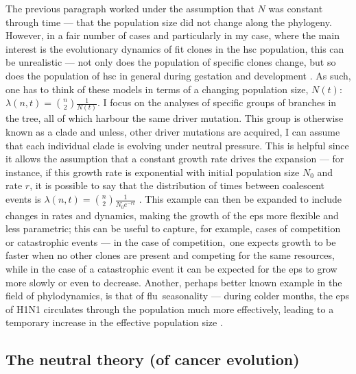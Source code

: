 The previous paragraph worked under the assumption that $N$ was constant through time --- that the population size did not change along the phylogeny. However, in a fair number of cases and particularly in my case, where the main interest is the evolutionary dynamics of fit clones in the \ac{hsc} population, this can be unrealistic --- not only does the population of specific clones change, but so does the population of \ac{hsc} in general during gestation and development \cite{Lee-Six2018-lp}. As such, one has to think of these models in terms of a changing population size, $N(t)$: $\lambda(n,t) = \binom{n}{2}\frac{1}{N(t)}$. I focus on the analyses of specific groups of branches in the tree, all of which harbour the same driver mutation. This group is otherwise known as a clade and unless, other driver mutations are acquired, I can assume that each individual clade is evolving under neutral pressure. This is helpful since it allows the assumption that a constant growth rate drives the expansion --- for instance, if this growth rate is exponential with initial population size $N_0$ and rate $r$, it is possible to say that the distribution of times between coalescent events is $\lambda(n,t) = \binom{n}{2}\frac{1}{N_0 e^{-rt}}$ \cite{Volz2013-ey}. This example can then be expanded to include changes in rates and dynamics, making the growth of the \ac{eps} more flexible and less parametric; this can be useful to capture, for example, cases of competition or catastrophic events --- in the case of competition, one expects growth to be faster when no other clones are present and competing for the same resources, while in the case of a catastrophic event it can be expected for the \ac{eps} to grow more slowly or even to decrease. Another, perhaps better known example in the field of phylodynamics, is that of flu seasonality --- during colder months, the \ac{eps} of H1N1 circulates through the population much more effectively, leading to a temporary increase in the effective population size \cite{Karcher2020-bg}.

\subsection{The neutral theory (of cancer evolution)}

